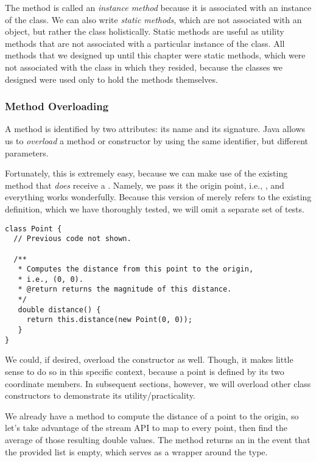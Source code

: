 The  method is called an \emph{instance method} because it is associated with an instance of the class. 
We can also write \emph{static methods}, which are not associated with an object, but rather the class holistically. 
Static methods are useful as utility methods that are not associated with a particular instance of the class. 
All methods that we designed up until this chapter were static methods, which were not associated with the class in which they resided, because the classes we designed were used only to hold the methods themselves.

\subsubsection*{Method Overloading}
A method is identified by two attributes: its name and its signature. 
Java allows us to \emph{overload} a method or constructor by using the same identifier, but different parameters.

Fortunately, this is extremely easy, because we can make use of the existing  method that \emph{does} receive a . 
Namely, we pass it the origin point, i.e., , and everything works wonderfully. 
Because this version of  merely refers to the existing definition, which we have thoroughly tested, we will omit a separate set of tests.

\begin{lstlisting}[language=MyJava]
class Point {
  // Previous code not shown.
  
  /**
   * Computes the distance from this point to the origin,
   * i.e., (0, 0).
   * @return returns the magnitude of this distance.
   */
   double distance() {
     return this.distance(new Point(0, 0));
   }
}
\end{lstlisting} 

We could, if desired, overload the  constructor as well. 
Though, it makes little sense to do so in this specific context, because a point is defined by its two coordinate members. 
In subsequent sections, however, we will overload other class constructors to demonstrate its utility/practicality.

We already have a method to compute the distance of a point to the origin, so let's take advantage of the stream API to map  to every point, then find the average of those resulting double values. 
The  method returns an  in the event that the provided list is empty, which serves as a wrapper around the  type.

